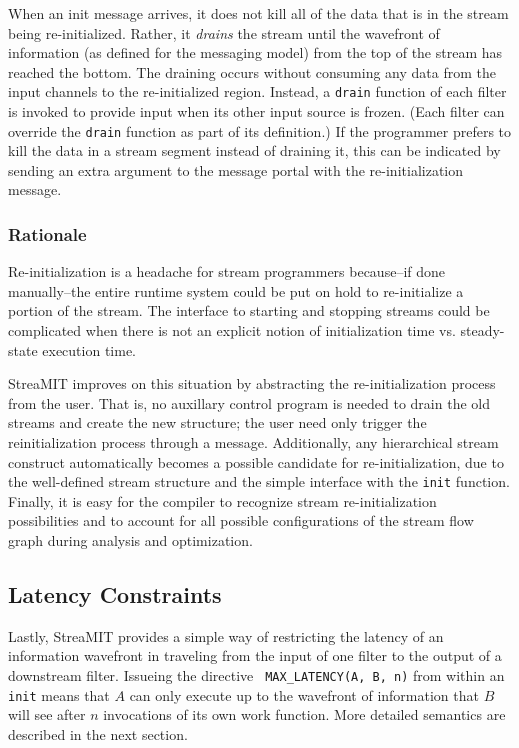 When an init message arrives, it does not kill all of the data that is
in the stream being re-initialized.  Rather, it {\it drains} the
stream until the wavefront of information (as defined for the
messaging model) from the top of the stream has reached the bottom.
The draining occurs without consuming any data from the input channels
to the re-initialized region.  Instead, a {\tt drain} function of each
filter is invoked to provide input when its other input source is
frozen.  (Each filter can override the {\tt drain} function as part of
its definition.)  If the programmer prefers to kill the data in a
stream segment instead of draining it, this can be indicated by
sending an extra argument to the message portal with the
re-initialization message.

\subsubsection{Rationale}

Re-initialization is a headache for stream programmers because--if
done manually--the entire runtime system could be put on hold to
re-initialize a portion of the stream.  The interface to starting and
stopping streams could be complicated when there is not an explicit
notion of initialization time vs. steady-state execution time.

StreaMIT improves on this situation by abstracting the
re-initialization process from the user.  That is, no auxillary
control program is needed to drain the old streams and create the new
structure; the user need only trigger the reinitialization process
through a message.  Additionally, any hierarchical stream construct
automatically becomes a possible candidate for re-initialization, due
to the well-defined stream structure and the simple interface with the
{\tt init} function.  Finally, it is easy for the compiler to
recognize stream re-initialization possibilities and to account for
all possible configurations of the stream flow graph during analysis
and optimization.

\subsection{Latency Constraints}

Lastly, StreaMIT provides a simple way of restricting the latency of
an information wavefront in traveling from the input of one filter to
the output of a downstream filter.  Issueing the directive {\tt
MAX\_LATENCY(A, B, n)} from within an {\tt init} means that $A$ can
only execute up to the wavefront of information that $B$ will see
after $n$ invocations of its own work function.  More detailed
semantics are described in the next section.

